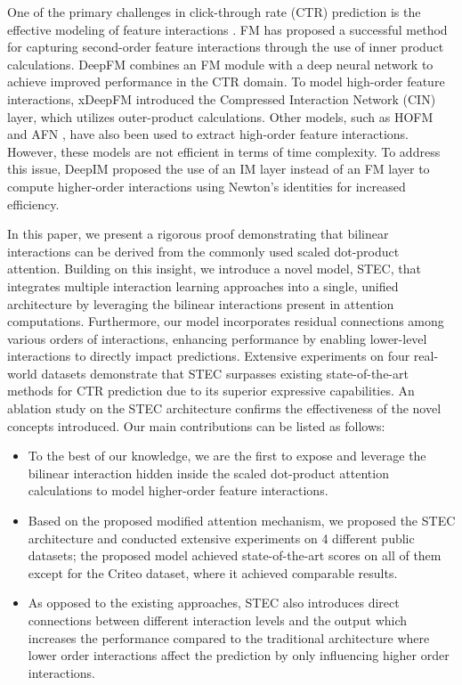 \documentclass{article}
\begin{document}
One of the primary challenges in click-through rate (CTR) prediction is the effective modeling of feature interactions \cite{guo2017deepfm, masknet2021, yu2020tagnn}. FM \cite{rendle2010factorization} has proposed a successful method for capturing second-order feature interactions through the use of inner product calculations. DeepFM \cite{guo2017deepfm} combines an FM module with a deep neural network to achieve improved performance in the CTR domain. To model high-order feature interactions, xDeepFM \cite{lian2018xdeepfm} introduced the Compressed Interaction Network (CIN) layer, which utilizes outer-product calculations. Other models, such as HOFM \cite{blondel2016higher} and AFN \cite{cheng2020adaptive}, have also been used to extract high-order feature interactions. However, these models are not efficient in terms of time complexity. To address this issue, DeepIM \cite{yu2020tagnn} proposed the use of an IM layer instead of an FM layer to compute higher-order interactions using Newton’s identities for increased efficiency.

In this paper, we present a rigorous proof demonstrating that bilinear interactions can be derived from the commonly used scaled dot-product attention. Building on this insight, we introduce a novel model, STEC, that integrates multiple interaction learning approaches into a single, unified architecture by leveraging the bilinear interactions present in attention computations. Furthermore, our model incorporates residual connections among various orders of interactions, enhancing performance by enabling lower-level interactions to directly impact predictions. Extensive experiments on four real-world datasets demonstrate that STEC surpasses existing state-of-the-art methods for CTR prediction due to its superior expressive capabilities. An ablation study on the STEC architecture confirms the effectiveness of the novel concepts introduced.
Our main contributions can be listed as follows:
\begin{itemize}
  \item To the best of our knowledge, we are the first to expose and leverage the bilinear interaction hidden inside the scaled dot-product attention calculations to model higher-order feature interactions.
  \item Based on the proposed modified attention mechanism, we proposed the STEC architecture and conducted extensive experiments on 4 different public datasets; the proposed model achieved state-of-the-art scores on all of them except for the Criteo dataset, where it achieved comparable results.
\item As opposed to the existing approaches, STEC also introduces direct connections between different interaction levels and the output which  increases the performance compared to the traditional architecture where lower order interactions affect the prediction by only influencing higher order interactions.
\end{itemize}
\end{document}
